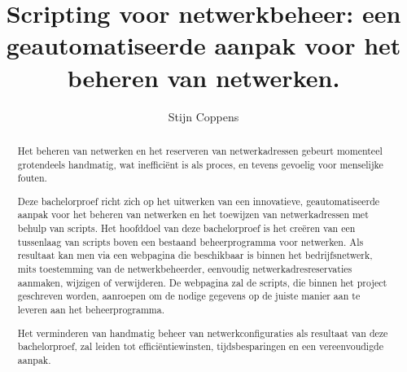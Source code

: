 \documentclass{hogent-article}
\title{Scripting voor netwerkbeheer: een geautomatiseerde aanpak voor het beheren van netwerken.}
\author{Stijn Coppens}
\begin{document}
\begin{abstract}
Het beheren van netwerken en het reserveren van netwerkadressen gebeurt momenteel grotendeels handmatig, wat inefficiënt is als proces, en tevens gevoelig voor menselijke fouten. 

Deze bachelorproef richt zich op het uitwerken van een innovatieve, geautomatiseerde aanpak voor het beheren van netwerken en het
toewijzen van netwerkadressen met behulp van scripts. 
Het hoofddoel van deze bachelorproef is het creëren van een tussenlaag van scripts boven een bestaand beheerprogramma voor netwerken. Als resultaat kan men via een webpagina die beschikbaar is binnen het bedrijfsnetwerk, mits toestemming van de netwerkbeheerder, eenvoudig netwerkadresreservaties aanmaken, wijzigen of verwijderen.
De webpagina zal de scripts, die binnen het project geschreven worden, aanroepen om de nodige gegevens op de juiste manier aan te leveren aan het beheerprogramma. 

Het verminderen van handmatig beheer van netwerkconfiguraties als resultaat van deze bachelorproef, zal leiden tot efficiëntiewinsten, tijdsbesparingen en een vereenvoudigde aanpak.


\end{abstract}
\tableofcontents
\end{document}
